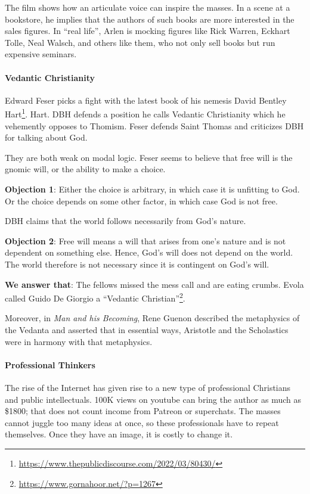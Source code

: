 The film shows how an articulate voice can inspire the masses. In a scene at a bookstore, he implies that the authors of such books are more interested in the sales figures. In ``real life'', Arlen is mocking figures like Rick Warren, Eckhart Tolle, Neal Walsch, and others like them, who not only sell books but run expensive seminars.

\paragraph{Vedantic Christianity}


Edward Feser picks a fight with the latest book of his nemesis David Bentley Hart\footnote{\url{https://www.thepublicdiscourse.com/2022/03/80430/}}. Hart. DBH defends a position he calls Vedantic Christianity which he vehemently opposes to Thomism. Feser defends Saint Thomas and criticizes DBH for talking about God.

They are both weak on modal logic. Feser seems to believe that free will is the gnomic will, or the ability to make a choice.

\textbf{Objection 1}: Either the choice is arbitrary, in which case it is unfitting to God. Or the choice depends on some other factor, in which case God is not free.

DBH claims that the world follows necessarily from God's nature.

\textbf{Objection 2}: Free will means a will that arises from one's nature and is not dependent on something else. Hence, God's will does not depend on the world. The world therefore is not necessary since it is contingent on God's will.

\textbf{We answer that}: The fellows missed the mess call and are eating crumbs. Evola called Guido De Giorgio a ``Vedantic Christian''\footnote{\url{https://www.gornahoor.net/?p=1267}}.

Moreover, in \emph{Man and his Becoming}, Rene Guenon described the metaphysics of the Vedanta and asserted that in essential ways, Aristotle and the Scholastics were in harmony with that metaphysics.

\paragraph{Professional Thinkers}


The rise of the Internet has given rise to a new type of professional Christians and public intellectuals. 100K views on youtube can bring the author as much as \$1800; that does not count income from Patreon or superchats. The masses cannot juggle too many ideas at once, so these professionals have to repeat themselves. Once they have an image, it is costly to change it.

